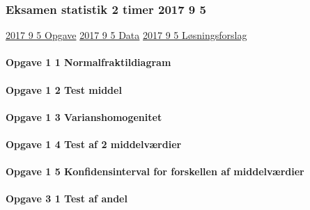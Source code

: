 \documentclass[]{book}
\let\oldparagraph\paragraph
\renewcommand{\paragraph}[1]{\oldparagraph{#1}\mbox{}}
\begin{document}
\hypertarget{eksamen-statistik-2-timer-2017-9-5}{%
\subsubsection{Eksamen statistik 2 timer 2017 9
5}\label{eksamen-statistik-2-timer-2017-9-5}}

\href{https://www.dropbox.com/s/3gd6mcocowe8glq/2017\%209\%20Statistik\%20Fin.pdf?dl=1}{2017
9 5 Opgave}
\href{https://www.dropbox.com/s/y4p8j90wjbzhtb3/2017\%209\%20statistik\%20Data\%202.RE.xlsx?dl=1}{2017
9 5 Data}
\href{https://www.dropbox.com/s/wruqocv7g0fvkob/2017\%209\%20Statistik\%20Fin\%20opg\%201\%20og\%203\%20l\%C3\%B8sning\%20skabelon\%20Freestat\%20.docx?dl=1}{2017
9 5 Løsningsforslag}

\hypertarget{opgave-1-1-normalfraktildiagram}{%
\paragraph{Opgave 1 1
Normalfraktildiagram}\label{opgave-1-1-normalfraktildiagram}}

\hypertarget{opgave-1-2-test-middel}{%
\paragraph{Opgave 1 2 Test middel}\label{opgave-1-2-test-middel}}

\hypertarget{opgave-1-3-varianshomogenitet}{%
\paragraph{Opgave 1 3
Varianshomogenitet}\label{opgave-1-3-varianshomogenitet}}

\hypertarget{opgave-1-4-test-af-2-middelvrdier}{%
\paragraph{Opgave 1 4 Test af 2
middelværdier}\label{opgave-1-4-test-af-2-middelvrdier}}

\hypertarget{opgave-1-5-konfidensinterval-for-forskellen-af-middelvrdier}{%
\paragraph{Opgave 1 5 Konfidensinterval for forskellen af
middelværdier}\label{opgave-1-5-konfidensinterval-for-forskellen-af-middelvrdier}}

\hypertarget{opgave-3-1-test-af-andel}{%
\paragraph{Opgave 3 1 Test af andel}\label{opgave-3-1-test-af-andel}}
\end{document}
